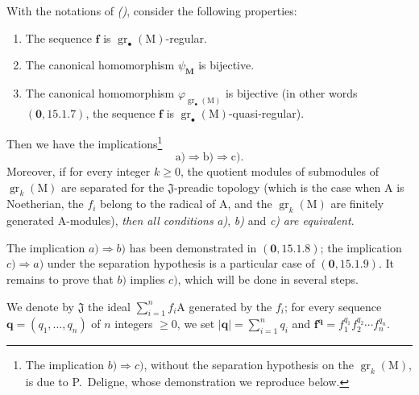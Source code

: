 \begin{theorem}[19.5.5]
\label{IV.19.5.5}
With the notations of \emph{()}, consider the following properties:
\begin{enumerate}
\item[\rm a)] The sequence $\mathbf{f}$ is $\operatorname{gr}_\bullet(\mathrm{M})$-regular.
\item[\rm b)] The canonical homomorphism $\psi_\mathbf{M}$ is bijective.
\item[\rm c)] The canonical homomorphism $\varphi_{\operatorname{gr}_\bullet(\mathrm{M})}$ is bijective (in other words $(\mathbf{0},15.1.7)$, the sequence $\mathbf{f}$ is $\operatorname{gr}_\bullet(\mathrm{M})$-quasi-regular).
\end{enumerate}
Then we have the implications\footnote{The implication $b)\Rightarrow c)$, without the separation hypothesis on the $\operatorname{gr}_k(\mathrm{M})$, is due to P.~Deligne, whose demonstration we reproduce below.}
\[
  \text{a)}\Rightarrow\text{b)}\Rightarrow\text{c)}.
\]
Moreover, if for every integer $k\geqslant 0$, the quotient modules of submodules of $\operatorname{gr}_k(\mathrm{M})$ are separated for the $\mathfrak{J}$-preadic topology (which is the case when $\mathrm{A}$ is Noetherian, the $f_i$ belong to the radical of $\mathrm{A}$, and the $\operatorname{gr}_k(\mathrm{M})$ are finitely generated $\mathrm{A}$-modules), \emph{then all conditions} \emph{a)}, \emph{b)} and \emph{c)} \emph{are equivalent}.

The implication $a)\Rightarrow b)$ has been demonstrated in $(\mathbf{0},15.1.8)$; the implication $c)\Rightarrow a)$ under the separation hypothesis is a particular case of $(\mathbf{0},15.1.9)$. It remains to prove that $b)$ implies $c)$, which will be done in several steps.

We denote by $\mathfrak{J}$ the ideal $\sum_{i=1}^{n}f_i\mathrm{A}$ generated by the $f_i$; for every sequence $\mathbf{q}=(q_1,\ldots,q_n)$ of $n$ integers $\geqslant 0$, we set $|\mathbf{q}|=\sum_{i=1}^{n}q_i$ and $\mathbf{f}^\mathbf{q}=f_1^{q_1}f_2^{q_2}\cdots f_n^{q_n}$.
\end{theorem}

